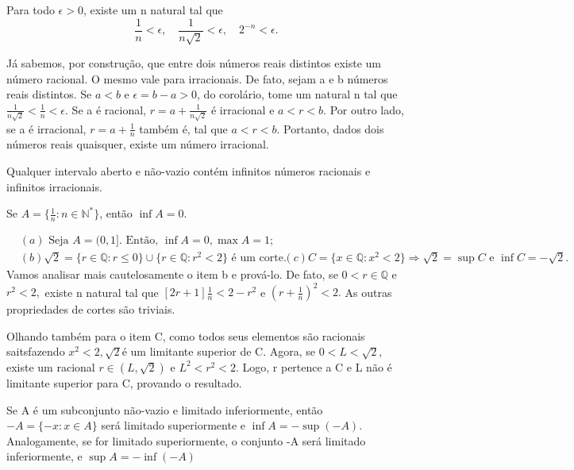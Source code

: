 \documentclass[analysis_notes.tex]{subfiles}
\begin{document}
\begin{crl*}
	Para todo $\epsilon > 0$, existe um n natural tal que
	$$
		\frac{1}{n} < \epsilon, \quad \frac{1}{n\sqrt{2}}<\epsilon, \quad 2^{-n} < \epsilon.
	$$
\end{crl*}
J\'a sabemos, por constru\c c\~ao, que entre dois n\'umeros reais distintos existe um n\'umero racional. O mesmo vale para irracionais.
De fato, sejam a e b n\'umeros reais distintos. Se $a < b$ e $\epsilon = b - a > 0$, do corol\'ario, tome um natural n tal que
$\displaystyle \frac{1}{n\sqrt{2}} < \frac{1}{n} < \epsilon.$ Se a \'e racional, $r = \displaystyle a + \frac{1}{n\sqrt{2}}$ \'e irracional e
$a < r < b.$ Por outro lado, se a \'e irracional, $r =\displaystyle a + \frac{1}{n}$ tamb\'em \'e, tal que $a < r < b.$ Portanto,
dados dois n\'umeros reais quaisquer, existe um n\'umero irracional.
\begin{crl*}
	Qualquer intervalo aberto e n\~ao-vazio cont\'em infinitos n\'umeros racionais e infinitos irracionais.
\end{crl*}
\begin{crl*}
	Se $A = \biggr\{\displaystyle \frac{1}{n}: n\in \mathbb{N}^*\biggl\}$, ent\~ao $\inf A = 0.$
\end{crl*}
\begin{example}
	\begin{align*}
		 & (a) \text{ Seja }A = (0, 1]. \text{ Ent\~ao, } \inf{A} = 0, \max{A} = 1;                         \\
		 & (b) \sqrt{2} = \{r\in\mathbb{Q}: r \leq 0\}\cup \{r\in\mathbb{Q}: r^2 < 2\}\text{ \'e um corte.}
		 & (c) C = \{x\in\mathbb{Q}: x^2 < 2\} \Rightarrow \sqrt{2}=\sup{C}\text{ e }\inf{C} = -\sqrt{2}.
	\end{align*}
	Vamos analisar mais cautelosamente o item b e prov\'a-lo. De fato, se $0 < r\in \mathbb{Q}$ e $r^2 < 2,$ existe n natural tal que
	$[2r + 1]\frac{1}{n} < 2 - r^2$ e $(r + \frac{1}{n})^2 < 2.$ As outras propriedades de cortes s\~ao triviais.

	Olhando tamb\'em para o item C, como todos seus elementos s\~ao racionais saitsfazendo $x^2 < 2, \sqrt{2}$\'e um limitante superior de C.
	Agora, se $0 < L < \sqrt{2}$, existe um racional $r\in(L, \sqrt{2})$ e $L^2 < r^2 < 2.$ Logo, r pertence a C e L n\~ao \'e limitante superior para C,
	provando o resultado.
\end{example}
\begin{prop*}
	Se A \'e um subconjunto n\~ao-vazio e limitado inferiormente, ent\~ao $-A = \{-x: x\in A\}$ ser\'a limitado superiormente e
	$\inf{A} = -\sup{(-A)}$. Analogamente, se for limitado superiormente, o conjunto -A ser\'a limitado inferiormente, e $\sup{A}=-\inf{(-A)}$
\end{prop*}
\end{document}
